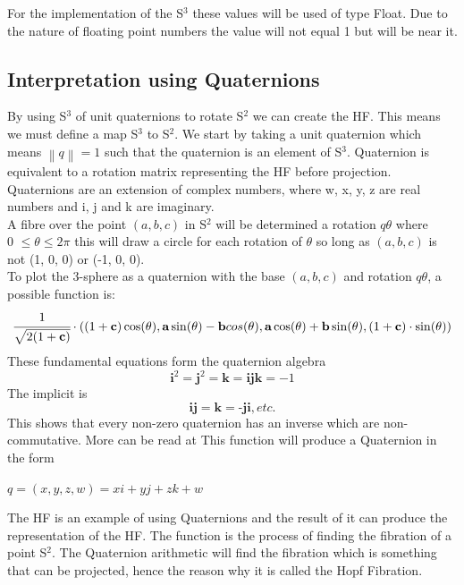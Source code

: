 \documentclass[12pt]{article} %
\begin{document}
\begin{flushleft}
For the implementation of the S$^{3}$ these values will be used of type Float. Due to the nature of floating point numbers the value will not equal 1 but will be near it.
\subsection{Interpretation using Quaternions} %
By using S$^{3}$ of unit quaternions to rotate S$^{2}$ we can create the HF. This means we must define a map S$^{3}$ to S$^{2}$. We start by taking a unit quaternion which means $ \left \| q \right \| = 1 $ such that the quaternion is an element of S$^{3}$. Quaternion is equivalent to a rotation matrix representing the HF before projection.\\
Quaternions are an extension of complex numbers, where w, x, y, z are real numbers and i, j and k are imaginary.\\
A fibre over the point $(a, b, c)$ in S$^{2}$ will be determined a rotation $q\theta$ where \\ 0 $\leq\theta\leq 2\pi$ this will draw a circle for each rotation of $\theta$ so long as $(a, b, c)$ is not (1, 0, 0) or (-1, 0, 0).\\
To plot the 3-sphere as a quaternion with the base $(a, b, c)$ and rotation $q\theta$, a possible function is:
\begin{equation}\label{bigboss}
\cfrac{1}{\sqrt{2(1 +\textbf{c})}}\cdot \left( \left( 1 + \textbf{c} \right)\cos( \theta), \textbf{a}\sin(\theta) - \textbf{b}cos(\theta), \textbf{a}\cos(\theta) + \textbf{b}\sin(\theta), (1 + \textbf{c})\cdot \sin(\theta)  \right)
\end{equation}
These fundamental equations form the quaternion algebra
\begin{equation}\label{quaternion}\textbf{i}^2 = \textbf{j}^2 = \textbf{k} = \textbf{ijk} = -1 \end{equation}
The implicit is
\begin{equation}\label{quaternionimp}\textbf{ij} = \textbf{k} = \textbf{-ji}, etc. \end{equation}
This shows that every non-zero quaternion has an inverse which are non-commutative. More can be read at \cite{Kuipers:q}
This function will produce a Quaternion in the form \begin{center}$q = (x, y, z, w) = xi + yj + zk + w$\end{center}
The HF is an example of using Quaternions and the result of it can produce the representation of the HF. The function is the process of finding the fibration of a point S$^{2}$. The Quaternion arithmetic will find the fibration which is something that can be projected, hence the reason why it is called the Hopf Fibration.

\end{flushleft}
\end{document}
